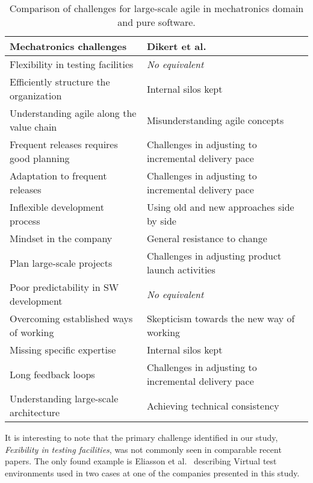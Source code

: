\documentclass[10pt,a4paper]{IEEEtran} %
\begin{document}
\begin{table}[t]
\centering
\caption{Comparison of challenges for large-scale agile in mechatronics domain and pure software.}
\label{tab:dikert}
\begin{tabular}{p{4.2cm} p{3.7cm}}
\hline
\textbf{Mechatronics challenges} & \textbf{Dikert et al.~\cite{dikert_challenges_2016}} \\
\hline
Flexibility in testing facilities & \emph{No equivalent} \\
Efficiently structure the organization & Internal silos kept \\
Understanding agile along the value chain  & Misunderstanding agile concepts \\
Frequent releases requires good planning  & Challenges in adjusting to incremental delivery pace \\
Adaptation to frequent releases  & Challenges in adjusting to incremental delivery pace \\
Inflexible development process  & Using old and new approaches side by side \\
Mindset in the company  & General resistance to change \\
Plan large-scale projects  & Challenges in adjusting product launch activities \\
Poor predictability in SW development  & \emph{No equivalent} \\
Overcoming established ways of working  & Skepticism towards the new way of working \\
Missing specific expertise  & Internal silos kept \\
Long feedback loops  & Challenges in adjusting to incremental delivery pace \\
Understanding large-scale architecture & Achieving technical consistency \\
\hline
\end{tabular}
\end{table}

It is interesting to note that the primary challenge identified in our study, \emph{Fexibility in testing facilities}, was not commonly seen in comparable recent papers. The only found example is Eliasson et al.~\cite{eliasson_agile_2014} describing Virtual test environments used in two cases at one of the companies presented in this study.
\end{document}
